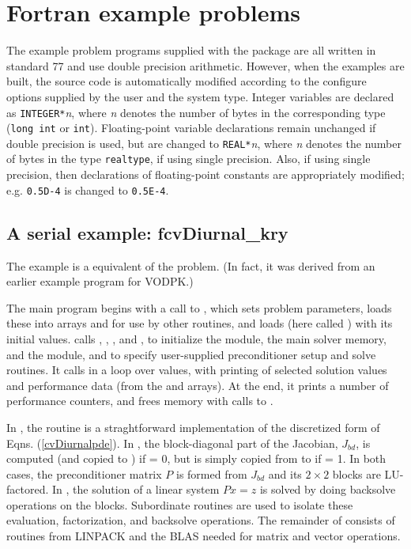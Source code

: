 \section{Fortran example problems}\label{s:ex_fortran}

The {\F} example problem programs supplied with the {\cvode}
package are all written in standard {\F}77 and use double precision
arithmetic. However, when the {\F} examples are built, the source code is
automatically modified according to the configure options supplied by the
user and the system type. Integer variables are declared as {\tt INTEGER*}{\em n},
where {\em n} denotes the number of bytes in the corresponding {\CC} type
({\tt long int} or {\tt int}). Floating-point variable declarations remain
unchanged if double precision is used, but are changed to {\tt REAL*}{\em n},
where {\em n} denotes the number of bytes in the {\sundials} type {\tt realtype},
if using single precision. Also, if using single precision, then declarations of
floating-point constants are appropriately modified; e.g. {\tt 0.5D-4} is
changed to {\tt 0.5E-4}.


\subsection{A serial example: fcvDiurnal\_kry}\label{ss:fcvDiurnal} 
The  example is a {\F} equivalent of the  problem.
(In fact, it was derived from an earlier {\F} example program for VODPK.)

The main program begins with a call to , which sets problem
parameters, loads these into arrays  and  for use by other
routines, and loads  (here called ) with its initial values.
 calls , , , and ,
to initialize the {\nvecs} module, the main solver memory, and the {\cvspgmr} module,
and to specify user-supplied preconditioner setup and solve routines.
It calls  in a loop over  values, with printing of
selected solution values and performance data (from the   and 
arrays).  At the end, it prints a number of performance counters, and
frees memory with calls to .

In , the  routine is a straghtforward implementation
of the discretized form of Eqns. (\ref{cvDiurnalpde}).  In , the
block-diagonal part of the Jacobian, $J_{bd}$, is computed (and copied to
) if  = 0, but is simply copied from  to  if
 = 1.  In both cases, the preconditioner matrix $P$ is formed from 
$J_{bd}$ and its $2 \times 2$ blocks are LU-factored.  In ,
the solution of a linear system $Px = z$ is solved by doing backsolve
operations on the blocks.  Subordinate routines are used to isolate
these evaluation, factorization, and backsolve operations.
The remainder of  consists of
routines from LINPACK and the BLAS needed for matrix and vector operations.


